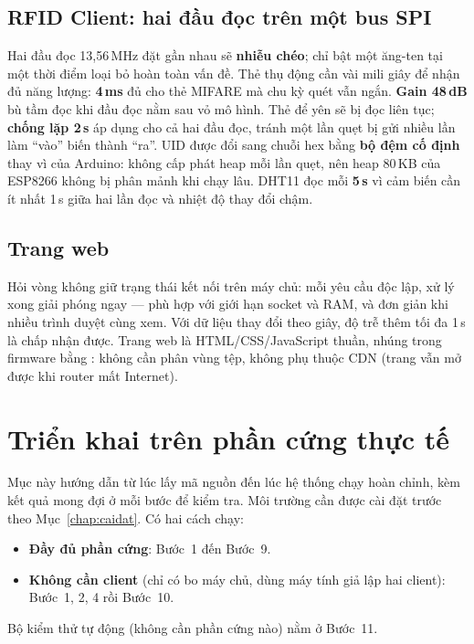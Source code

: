 \subsection{RFID Client: hai đầu đọc trên một bus SPI}
\begin{lydo}
Hai đầu đọc 13,56\,MHz đặt gần nhau sẽ \textbf{nhiễu chéo}; chỉ bật một ăng-ten tại
một thời điểm loại bỏ hoàn toàn vấn đề. Thẻ thụ động cần vài mili giây để nhận đủ năng
lượng: \textbf{4\,ms} đủ cho thẻ MIFARE mà chu kỳ quét vẫn ngắn. \textbf{Gain 48\,dB} bù
tầm đọc khi đầu đọc nằm sau vỏ mô hình. Thẻ để yên sẽ bị đọc liên tục; \textbf{chống
lặp 2\,s} áp dụng cho cả hai đầu đọc, tránh một lần quẹt bị gửi nhiều lần làm ``vào''
biến thành ``ra''. UID được đổi sang chuỗi hex bằng \textbf{bộ đệm cố định} thay vì
 của Arduino: không cấp phát heap mỗi lần quẹt, nên heap 80\,KB của
ESP8266 không bị phân mảnh khi chạy lâu. DHT11 đọc mỗi \textbf{5\,s} vì cảm biến cần ít
nhất 1\,s giữa hai lần đọc và nhiệt độ thay đổi chậm.
\end{lydo}

\subsection{Trang web}
\begin{lydo}
Hỏi vòng không giữ trạng thái kết nối trên máy chủ: mỗi yêu cầu độc lập, xử lý xong
giải phóng ngay — phù hợp với giới hạn socket và RAM, và đơn giản khi nhiều trình duyệt
cùng xem. Với dữ liệu thay đổi theo giây, độ trễ thêm tối đa 1\,s là chấp nhận được.
Trang web là HTML/CSS/JavaScript thuần, nhúng trong firmware bằng
: không cần phân vùng tệp, không phụ thuộc CDN (trang vẫn mở được
khi router mất Internet).
\end{lydo}


\section{Triển khai trên phần cứng thực tế}\label{chap:huongdanchay}

Mục này hướng dẫn từ lúc lấy mã nguồn đến lúc hệ thống chạy hoàn chỉnh, kèm kết
quả mong đợi ở mỗi bước để kiểm tra. Môi trường cần được cài đặt trước theo
Mục~\ref{chap:caidat}. Có hai cách chạy:
\begin{itemize}
  \item \textbf{Đầy đủ phần cứng}: Bước~1 đến Bước~9.
  \item \textbf{Không cần client} (chỉ có bo máy chủ, dùng máy tính giả lập hai client):
        Bước~1, 2, 4 rồi Bước~10.
\end{itemize}
Bộ kiểm thử tự động (không cần phần cứng nào) nằm ở Bước~11.

